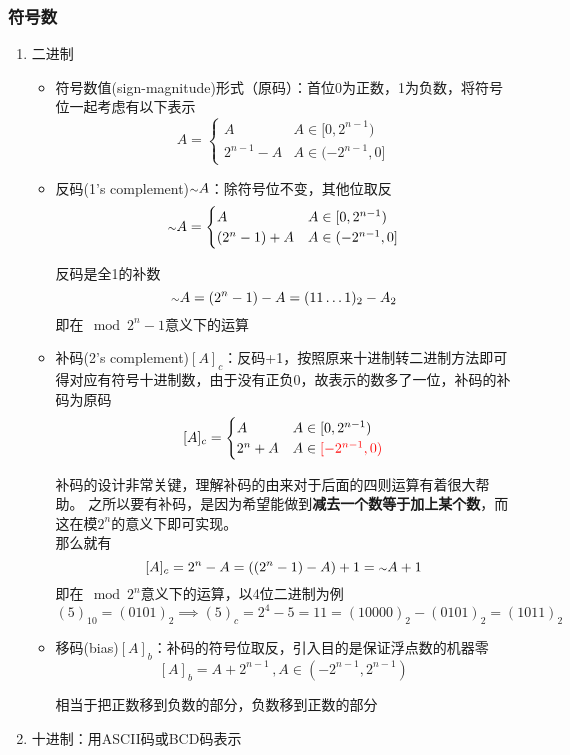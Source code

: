 \subsubsection{符号数}
\begin{enumerate}
\item 二进制
\begin{itemize}
	\item 符号数值(sign-magnitude)形式（原码）：首位0为正数，1为负数，将符号位一起考虑有以下表示
	\[A=\begin{cases}
	A & A\in[0,2^{n-1})\\
	2^{n-1}-A & A\in(-2^{n-1},0]
	\end{cases}\]
	\item 反码(1's complement)${\scriptstyle{\sim}} A$：除符号位不变，其他位取反
	\[{\scriptstyle{\sim}} A=\begin{cases}
	A & A\in[0,2^{n-1})\\
	(2^n-1)+A & A\in (-2^{n-1},0]
	\end{cases}\]
	\begin{analysis}
	反码是全1的补数
	\[{\scriptstyle{\sim}} A=(2^n-1)-A=(11\ldots 1)_2-A_2\]
	即在$\mod 2^{n}-1$意义下的运算
	\end{analysis}
	\item 补码(2's complement)$[A]_c$：反码+1，按照原来十进制转二进制方法即可得对应有符号十进制数，由于没有正负0，故表示的数多了一位，补码的补码为原码
	\[[A]_c=\begin{cases}
	A & A\in[0,2^{n-1})\\
	2^n+A & A\in \textcolor{red}{[-2^{n-1},0)}
	\end{cases}\]
	\begin{analysis}
	补码的设计非常关键，理解补码的由来对于后面的四则运算有着很大帮助。
	之所以要有补码，是因为希望能做到\textbf{减去一个数等于加上某个数}，而这在模$2^n$的意义下即可实现。\\
	那么就有
	\[[A]_c=2^n-A=((2^n-1)-A)+1={\scriptstyle{\sim}} A+1\]
	即在$\mod 2^n$意义下的运算，以4位二进制为例
	\[(5)_{10}=(0101)_2\implies (5)_c=2^4-5=11=(10000)_2-(0101)_2=(1011)_2\]
	\end{analysis}
	\item 移码(bias)$[A]_b$：补码的符号位取反，引入目的是保证浮点数的机器零
	\[[A]_b=A+2^{n-1}\,,A\in(-2^{n-1},2^{n-1})\]
	\begin{analysis}
	相当于把正数移到负数的部分，负数移到正数的部分
	\end{analysis}
\end{itemize}
\item 十进制：用ASCII码或BCD码表示
\end{enumerate}

